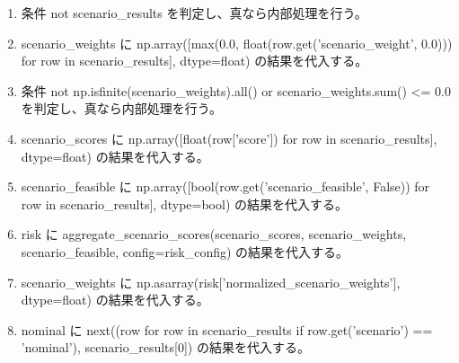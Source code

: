 \documentclass[a4paper,11pt]{article}
\begin{document}
            \begin{enumerate}[leftmargin=1.8em]
            \item 条件 not scenario\_results を判定し、真なら内部処理を行う。
\item scenario\_weights に np.array([max(0.0, float(row.get('scenario\_weight', 0.0))) for row in scenario\_results], dtype=float) の結果を代入する。
\item 条件 not np.isfinite(scenario\_weights).all() or scenario\_weights.sum() <= 0.0 を判定し、真なら内部処理を行う。
\item scenario\_scores に np.array([float(row['score']) for row in scenario\_results], dtype=float) の結果を代入する。
\item scenario\_feasible に np.array([bool(row.get('scenario\_feasible', False)) for row in scenario\_results], dtype=bool) の結果を代入する。
\item risk に aggregate\_scenario\_scores(scenario\_scores, scenario\_weights, scenario\_feasible, config=risk\_config) の結果を代入する。
\item scenario\_weights に np.asarray(risk['normalized\_scenario\_weights'], dtype=float) の結果を代入する。
\item nominal に next((row for row in scenario\_results if row.get('scenario') == 'nominal'), scenario\_results[0]) の結果を代入する。

\end{enumerate}
\end{document}
